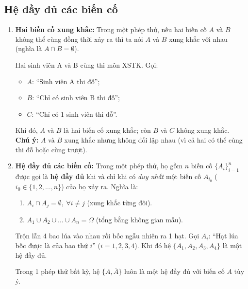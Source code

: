 \subsection{Hệ đầy đủ các biến cố}
\begin{enumerate}[label=\alph*), leftmargin=1.5em]
    \item \textbf{Hai biến cố xung khắc:}
    Trong một phép thử, nếu hai biến cố $A$ và $B$ không thể cùng đồng thời xảy ra thì ta nói $A$ và $B$ xung khắc với nhau (nghĩa là $A \cap B = \emptyset$).

    \begin{vidu}
    Hai sinh viên A và B cùng thi môn XSTK. Gọi:
    \begin{itemize}
        \item $A$: ``Sinh viên A thi đỗ'';
        \item $B$: ``Chỉ có sinh viên B thi đỗ'';
        \item $C$: ``Chỉ có 1 sinh viên thi đỗ''.
    \end{itemize}
    Khi đó, $A$ và $B$ là hai biến cố xung khắc; còn $B$ và $C$ không xung khắc.\\
    \textbf{Chú ý:} $A$ và $B$ xung khắc nhưng không đối lập nhau (vì cả hai có thể cùng thi đỗ hoặc cùng trượt).
    \end{vidu}

    \item \textbf{Hệ đầy đủ các biến cố:}
    Trong một phép thử, họ gồm $n$ biến cố $\{A_i\}_{i=1}^n$ được gọi là \textbf{hệ đầy đủ} khi và chỉ khi có \textit{duy nhất} một biến cố $A_{i_0}$ ($i_0 \in \{1, 2, \dots, n\}$) của họ xảy ra. Nghĩa là:
    \begin{enumerate}[label=\arabic*)]
        \item $A_i \cap A_j = \emptyset,\ \forall i \ne j$ (xung khắc từng đôi).
        \item $A_1 \cup A_2 \cup \dots \cup A_n = \Omega$ (tổng bằng không gian mẫu).
    \end{enumerate}

    \begin{vidu}
    Trộn lẫn 4 bao lúa vào nhau rồi bốc ngẫu nhiên ra 1 hạt.
    Gọi $A_i$: ``Hạt lúa bốc được là của bao thứ $i$'' ($i = 1, 2, 3, 4$).
    Khi đó hệ $\{A_1, A_2, A_3, A_4\}$ là một hệ đầy đủ.
    \end{vidu}

    \begin{chuy}
    Trong 1 phép thử bất kỳ, hệ $\{A, \overline{A}\}$ luôn là một hệ đầy đủ với biến cố $A$ tùy ý.
    \end{chuy}
\end{enumerate}

